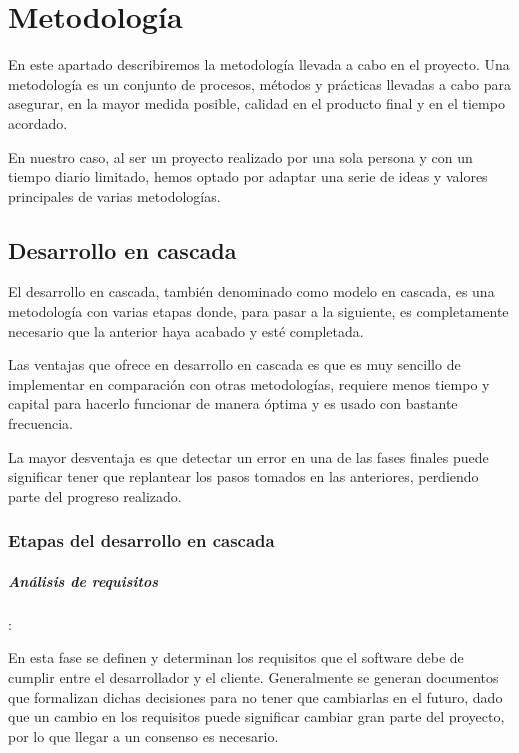 \chapter{Metodología}

En este apartado describiremos la metodología llevada a cabo en el proyecto. Una metodología es un conjunto de procesos, métodos y prácticas llevadas a cabo para asegurar, en la mayor medida posible, calidad en el producto final y en el tiempo acordado.

En nuestro caso, al ser un proyecto realizado por una sola persona y con un tiempo diario limitado, hemos optado por adaptar una serie de ideas y valores principales de varias metodologías.

\section{Desarrollo en cascada}

El desarrollo en cascada, también denominado como modelo en cascada, es una metodología con varias etapas donde, para pasar a la siguiente, es completamente necesario que la anterior haya acabado y esté completada.

Las ventajas que ofrece en desarrollo en cascada es que es muy sencillo de implementar en comparación con otras metodologías, requiere menos tiempo y capital para hacerlo funcionar de manera óptima y es usado con bastante frecuencia.

La mayor desventaja es que detectar un error en una de las fases finales puede significar tener que replantear los pasos tomados en las anteriores, perdiendo parte del progreso realizado.

\subsection{Etapas del desarrollo en cascada}

\paragraph{Análisis de requisitos}: 

En esta fase se definen y determinan los requisitos que el software debe de cumplir entre el desarrollador y el cliente. Generalmente se generan documentos que formalizan dichas decisiones para no tener que cambiarlas en el futuro, dado que un cambio en los requisitos puede significar cambiar gran parte del proyecto, por lo que llegar a un consenso es necesario.


